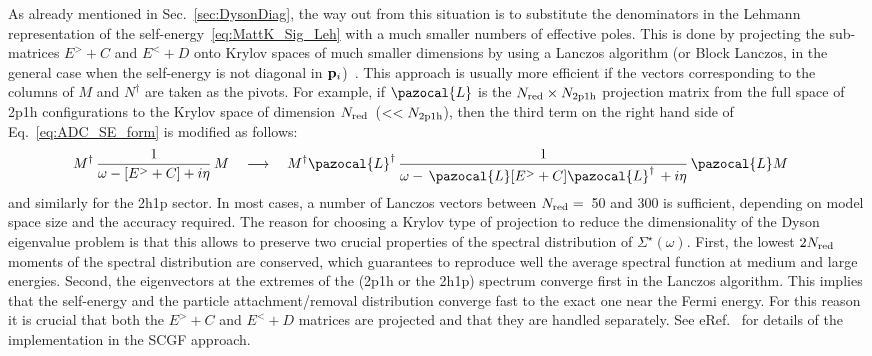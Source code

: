 As already mentioned in Sec.~\ref{sec:DysonDiag},
the way out from this situation is to substitute the denominators in the Lehmann representation of the self-energy~\eqref{eq:MattK_Sig_Leh}
with a much smaller numbers of effective poles.  This is done by projecting the sub-matrices $E^>+C$ and $E^<+D$ onto Krylov spaces of much smaller dimensions by using a Lanczos algorithm (or Block Lanczos, in the general case when the self-energy is not diagonal in ${\bf p}_i$)~\cite{ch11_MatrixComputations}.  This approach is usually more efficient if the vectors corresponding to the columns of $M$ and $N^\dagger$ are taken as the pivots.
%
For example, if $\pazocal{L}$ is the \hbox{$N_{\rm red}\times N_{\rm 2p1h}$} projection matrix from the full space of 2p1h configurations to the Krylov space of dimension $N_{\rm red}$~($<< N_{\rm 2p1h}$), then the third term on the right hand side of Eq.~\eqref{eq:ADC_SE_form} is modified as follows:
\begin{align}
   M^\dagger \, \frac1{\omega - [E^> +C] + i \eta} \, M    {}&  \quad  \longrightarrow \quad
   M^\dagger  \pazocal{L}^\dagger \,  \frac1{\omega -  \, \pazocal{L}[E^> +C] \pazocal{L}^\dagger \, + i \eta} \, \pazocal{L} M
      \label{eq:sigma_Lanc}
\end{align}
and similarly for the 2h1p sector.  In most cases, a number of Lanczos vectors between $N_{\rm red}=$~50 and 300 is sufficient, depending on model space size and the  accuracy required.  The reason for choosing a Krylov type of projection to reduce the dimensionality of the Dyson eigenvalue problem is that this allows to preserve two  crucial properties of the spectral distribution of $\Sigma^\star(\omega)$. First, the lowest $2N_{\rm red}$ moments of the spectral distribution are conserved, which guarantees to reproduce well the average spectral function at medium and large energies. Second, the eigenvectors at the extremes of the (2p1h or the 2h1p) spectrum converge first in the Lanczos algorithm. This implies that the self-energy and the particle attachment/removal distribution converge fast to the exact one near the Fermi energy. For this reason it is crucial that both the $E^>+C$ and $E^<+D$ matrices are projected and that they are handled separately.
See eRef.~\cite{ch11_Soma2014Lanc} for details of the implementation in the SCGF approach.



